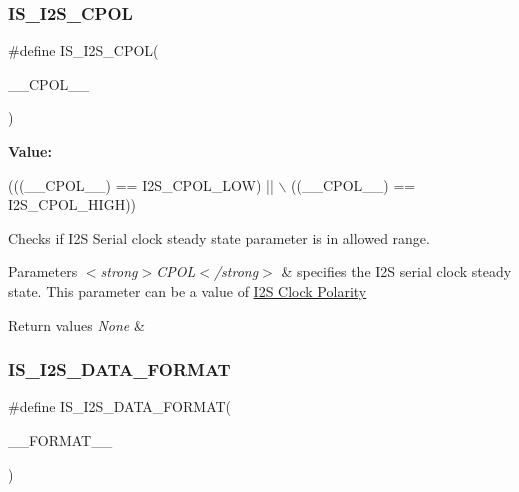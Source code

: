 \subsubsection{\texorpdfstring{I\+S\+\_\+\+I2\+S\+\_\+\+C\+P\+OL}{IS\_I2S\_CPOL}}
{\footnotesize\ttfamily \#define I\+S\+\_\+\+I2\+S\+\_\+\+C\+P\+OL(\begin{DoxyParamCaption}\item[{}]{\+\_\+\+\_\+\+C\+P\+O\+L\+\_\+\+\_\+ }\end{DoxyParamCaption})}

{\bfseries Value\+:}
\begin{DoxyCode}
(((\_\_CPOL\_\_) == I2S\_CPOL\_LOW) || \(\backslash\)
                           ((\_\_CPOL\_\_) == I2S\_CPOL\_HIGH))
\end{DoxyCode}


Checks if I2S Serial clock steady state parameter is in allowed range. 


\begin{DoxyParams}{Parameters}
{\em $<$strong$>$\+C\+P\+O\+L$<$/strong$>$} & specifies the I2S serial clock steady state. This parameter can be a value of \hyperlink{group___i2_s___clock___polarity}{I2S Clock Polarity} \\
\hline
\end{DoxyParams}

\begin{DoxyRetVals}{Return values}
{\em None} & \\
\hline
\end{DoxyRetVals}
\mbox{\label{group___i2_s___private___macros_gaf6ce0f7bc5f635244100c607e1ee61a7}} 
\subsubsection{\texorpdfstring{I\+S\+\_\+\+I2\+S\+\_\+\+D\+A\+T\+A\+\_\+\+F\+O\+R\+M\+AT}{IS\_I2S\_DATA\_FORMAT}}
{\footnotesize\ttfamily \#define I\+S\+\_\+\+I2\+S\+\_\+\+D\+A\+T\+A\+\_\+\+F\+O\+R\+M\+AT(\begin{DoxyParamCaption}\item[{}]{\+\_\+\+\_\+\+F\+O\+R\+M\+A\+T\+\_\+\+\_\+ }\end{DoxyParamCaption})}

